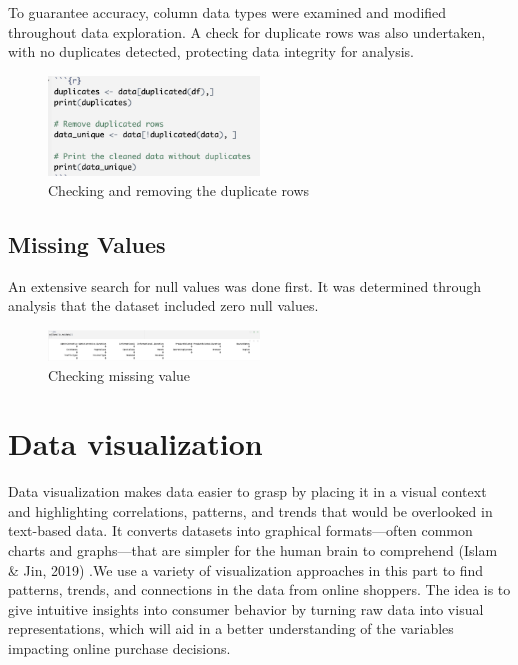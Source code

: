 \documentclass[12pt]{article}
\begin{document}
\justifying To guarantee accuracy, column data types were examined and modified throughout data exploration. A check for duplicate rows was also undertaken, with no duplicates detected, protecting data integrity for analysis.
\begin{figure}[h]
    \center
    \includegraphics[width=0.5\textwidth]{Screenshot 2024-10-09 at 15.23.25.png}  
    \caption{Checking and removing the duplicate rows}
    \label{fig:example}
    \vspace{0.5cm}
\end{figure}

\subsection{Missing Values}
An extensive search for null values was done first. It was determined through analysis that the dataset included zero null values.
\begin{figure}[h]
    \center
    \includegraphics[width=0.5\textwidth]{Screenshot 2024-10-09 at 22.27.50.png}  
    \caption{Checking missing value}
    \label{fig:example}
    \vspace{0.5cm}
\end{figure}

\newpage


\section{Data visualization}
Data visualization makes data easier to grasp by placing it in a visual context and highlighting correlations, patterns, and trends that would be overlooked in text-based data. It converts datasets into graphical formats—often common charts and graphs—that are simpler for the human brain to comprehend (Islam & Jin, 2019) \cite{Islam}.We use a variety of visualization approaches in this part to find patterns, trends, and connections in the data from online shoppers. The idea is to give intuitive insights into consumer behavior by turning raw data into visual representations, which will aid in a better understanding of the variables impacting online purchase decisions.
\end{document}
